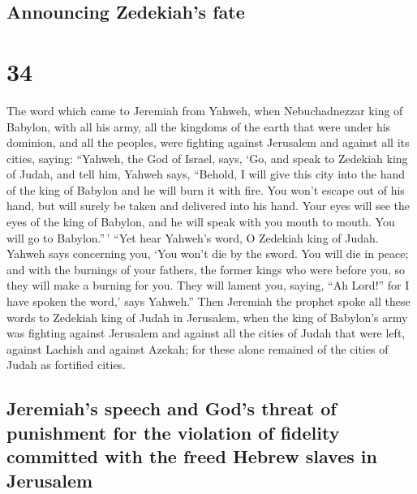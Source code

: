 \hypertarget{announcing-zedekiahs-fate}{%
\subsection{Announcing Zedekiah's
fate}\label{announcing-zedekiahs-fate}}

\hypertarget{section-33}{%
\section{34}\label{section-33}}

 The word which came to Jeremiah from Yahweh, when
Nebuchadnezzar king of Babylon, with all his army, all the kingdoms of
the earth that were under his dominion, and all the peoples, were
fighting against Jerusalem and against all its cities, saying:
 ``Yahweh, the God of Israel, says, `Go, and speak to
Zedekiah king of Judah, and tell him, Yahweh says, ``Behold, I will give
this city into the hand of the king of Babylon and he will burn it with
fire.  You won't escape out of his hand, but will surely
be taken and delivered into his hand. Your eyes will see the eyes of the
king of Babylon, and he will speak with you mouth to mouth. You will go
to Babylon.''\,'  ``Yet hear Yahweh's word, O Zedekiah
king of Judah. Yahweh says concerning you, `You won't die by the sword.
 You will die in peace; and with the burnings of your
fathers, the former kings who were before you, so they will make a
burning for you. They will lament you, saying, ``Ah Lord!'' for I have
spoken the word,' says Yahweh.''  Then Jeremiah the
prophet spoke all these words to Zedekiah king of Judah in Jerusalem,
 when the king of Babylon's army was fighting against
Jerusalem and against all the cities of Judah that were left, against
Lachish and against Azekah; for these alone remained of the cities of
Judah as fortified cities.

\hypertarget{jeremiahs-speech-and-gods-threat-of-punishment-for-the-violation-of-fidelity-committed-with-the-freed-hebrew-slaves-in-jerusalem}{%
\subsection{Jeremiah's speech and God's threat of punishment for the
violation of fidelity committed with the freed Hebrew slaves in
Jerusalem}\label{jeremiahs-speech-and-gods-threat-of-punishment-for-the-violation-of-fidelity-committed-with-the-freed-hebrew-slaves-in-jerusalem}}

